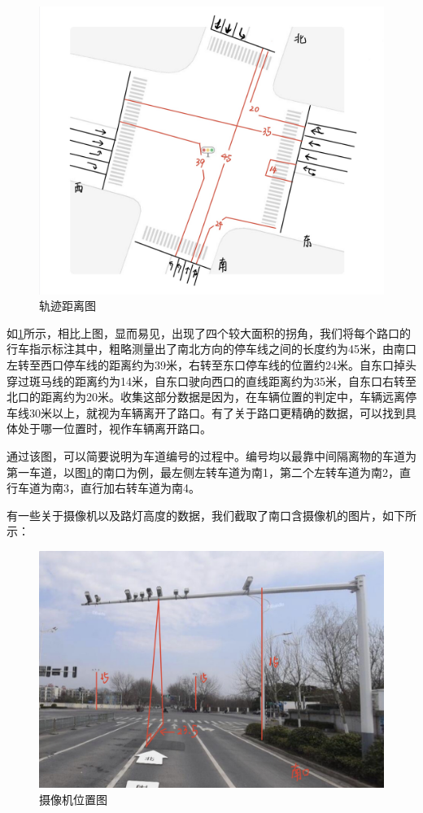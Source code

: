 \begin{figure}[h]
    \centering
    \includegraphics[scale=0.15]{figures/路口平面图.jpg}
    \caption{轨迹距离图}
    \label{fig:p2}
\end{figure}

如\ref{fig:p2}所示，相比上图，显而易见，出现了四个较大面积的拐角，我们将每个路口的行车指示标注其中，粗略测量出了南北方向的停车线之间的长度约为45米，由南口左转至西口停车线的距离约为39米，右转至东口停车线的位置约24米。自东口掉头穿过斑马线的距离约为14米，自东口驶向西口的直线距离约为35米，自东口右转至北口的距离约为20米。收集这部分数据是因为，在车辆位置的判定中，车辆远离停车线30米以上，就视为车辆离开了路口。有了关于路口更精确的数据，可以找到具体处于哪一位置时，视作车辆离开路口。

通过该图，可以简要说明为车道编号的过程中。编号均以最靠中间隔离物的车道为第一车道，以图\ref{fig:p2}的南口为例，最左侧左转车道为南1，第二个左转车道为南2，直行车道为南3，直行加右转车道为南4。

有一些关于摄像机以及路灯高度的数据，我们截取了南口含摄像机的图片，如下所示：

\begin{figure}[h]
    \centering
    \includegraphics[scale=0.15]{figures/摄像机位置图.jpg}
    \caption{摄像机位置图}
    \label{fig:p3}
\end{figure}

